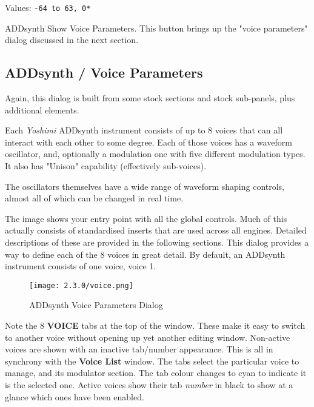    Values: \texttt{-64 to 63, 0*}

   ADDsynth Show Voice Parameters.
   This button brings up the "voice parameters" dialog discussed in the next
   section.

\subsection{ADDsynth / Voice Parameters}
\label{subsec:addsynth_voice_parameters}

   Again, this dialog is built from some stock sections and stock
   sub-panels, plus additional elements.

   Each \textsl{Yoshimi} ADDsynth instrument consists of up to 8 voices
   that can all interact with each other to some degree. Each of those voices
   has a waveform oscillator, and, optionally a modulation one with five
   different modulation types. It also has "Unison" capability (effectively
   sub-voices).

   The oscillators themselves have a wide range of waveform shaping controls,
   almost all of which can be changed in real time.

    The image shows your entry point with all the global controls. Much of this
    actually consists of standardised inserts that are used across all engines.
    Detailed descriptions of these are provided in the following sections.
    This dialog provides a way to define each of the 8 voices in great detail.
    By default, an ADDsynth instrument consists of one voice, voice 1.

\begin{figure}[H]
   \centering
   \texttt{[image: 2.3.0/voice.png]}
   \caption{ADDsynth Voice Parameters Dialog}
   \label{fig:addsynth_voice_parameters_dialog}
\end{figure}

   Note the 8 \textbf{VOICE} tabs at the top of the window.
   These make it easy to switch to another voice without opening up yet
   another editing window.
   Non-active voices are shown with an inactive tab/number appearance.
   This is all in synchrony with the \textbf{Voice List} window.
   The tabs select the particular voice to manage, and its modulator section.
   The tab colour changes to cyan to indicate it is the selected one.
   Active voices show their tab \textsl{number} in black to show
   at a glance which ones have been enabled.

